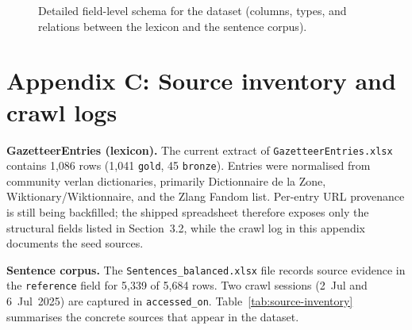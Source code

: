 \documentclass[12pt]{article}
\newif\ifskipsectionclear
\begin{document}
\begin{figure}[H]
{
}%
\caption{Detailed field-level schema for the dataset (columns, types, and relations between the lexicon and the sentence corpus).}
\label{fig:dataset-schema-detailed}
\end{figure}

\cleardoublepage
\skipsectioncleartrue
\section{Appendix C: Source inventory and crawl logs}

\noindent \textbf{GazetteerEntries (lexicon).} The current extract of \texttt{GazetteerEntries.xlsx} contains 1{,}086 rows (1{,}041 \texttt{gold}, 45 \texttt{bronze}). Entries were normalised from community verlan dictionaries, primarily Dictionnaire de la Zone, Wiktionary/Wiktionnaire, and the Zlang Fandom list. Per-entry URL provenance is still being backfilled; the shipped spreadsheet therefore exposes only the structural fields listed in Section~3.2, while the crawl log in this appendix documents the seed sources.

\noindent \textbf{Sentence corpus.} The \texttt{Sentences\_balanced.xlsx} file records source evidence in the \texttt{reference} field for 5{,}339 of 5{,}684 rows. Two crawl sessions (2~Jul and 6~Jul~2025) are captured in \texttt{accessed\_on}. Table~\ref{tab:source-inventory} summarises the concrete sources that appear in the dataset.
\end{document}
